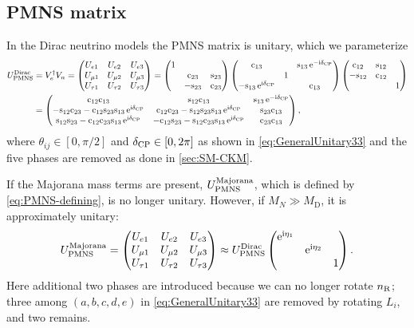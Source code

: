 \documentclass[CheatSheet]{subfiles}
\newcommand\MD[1][]{M_{\mathrm{D}#1}}
\newcommand\MN[1][]{M_{N#1}}
\begin{document}
\subsection{PMNS matrix}\label{sec:PMNS}
In the Dirac neutrino models the PMNS matrix is unitary, which we parameterize
\begin{equation}
\begin{split}
   U_{\mathrm{PMNS}}^{\text{Dirac}}&=V_e^\dagger V_n
 =\begin{pmatrix}
 U_{e1} & U_{e2} & U_{e3}\\
 U_{\mu1} & U_{\mu2} & U_{\mu3}\\
 U_{\tau1} & U_{\tau2} & U_{\tau3}
 \end{pmatrix}
 =
 \begin{pmatrix}1&&\\&\mathrm{c}_{23}&\mathrm{s}_{23}\\&-\mathrm{s}_{23}&\mathrm{c}_{23}\end{pmatrix}
 \begin{pmatrix}\mathrm{c}_{13}&&\mathrm{s}_{13}\mathop{}\!\mathrm{e}^{-\mathrm{i}\delta_{\mathrm{CP}}}\\&1&\\-\mathrm{s}_{13}\mathop{}\!\mathrm{e}^{\mathrm{i}\delta_{\mathrm{CP}}}&&\mathrm{c}_{13}\end{pmatrix}
 \begin{pmatrix}\mathrm{c}_{12}&\mathrm{s}_{12}&\\-\mathrm{s}_{12}&\mathrm{c}_{12}&\\&&1\end{pmatrix}
 \\&=
 \begin{pmatrix}
 \mathrm{c}_{12} \mathrm{c}_{13} & \mathrm{s}_{12} \mathrm{c}_{13} & \mathrm{s}_{13} \mathop{}\!\mathrm{e}^{-\mathrm{i}\delta_{\mathrm{CP}}}\\
 -\mathrm{s}_{12} \mathrm{c}_{23} - \mathrm{c}_{12} \mathrm{s}_{23} \mathrm{s}_{13} \mathop{}\!\mathrm{e}^{\mathrm{i}\delta_{\mathrm{CP}}}& \mathrm{c}_{12} \mathrm{c}_{23} - \mathrm{s}_{12}\mathrm{s}_{23}\mathrm{s}_{13} \mathop{}\!\mathrm{e}^{\mathrm{i}\delta_{\mathrm{CP}}}& \mathrm{s}_{23}\mathrm{c}_{13}\\
  \mathrm{s}_{12}\mathrm{s}_{23} - \mathrm{c}_{12} \mathrm{c}_{23} \mathrm{s}_{13}\mathop{}\!\mathrm{e}^{\mathrm{i}\delta_{\mathrm{CP}}} & -\mathrm{c}_{12}\mathrm{s}_{23}-\mathrm{s}_{12}\mathrm{c}_{23}\mathrm{s}_{13}\mathop{}\!\mathrm{e}^{\mathrm{i}\delta_{\mathrm{CP}}} & \mathrm{c}_{23} \mathrm{c}_{13}
\end{pmatrix},
\end{split}
\end{equation}
where $\theta_{ij}\in[0,\pi/2]$ and $\delta_{\mathrm{CP}}\in[0,2\pi]$ as shown in \cref{eq:GeneralUnitary33} and the five phases are removed as done in \cref{sec:SM-CKM}.

If the Majorana mass terms are present, $U_{\mathrm{PMNS}}^{\text{Majorana}}$, which is defined by \cref{eq:PMNS-defining}, is no longer unitary.
However, if $\MN\gg\MD$, it is approximately unitary:
\begin{equation}
   U_{\mathrm{PMNS}}^{\text{Majorana}}=
\begin{pmatrix}
 U_{e1} & U_{e2} & U_{e3}\\
 U_{\mu1} & U_{\mu2} & U_{\mu3}\\
 U_{\tau1} & U_{\tau2} & U_{\tau3}
 \end{pmatrix}
\approx
U_{\mathrm{PMNS}}^{\text{Dirac}}
\begin{pmatrix}\mathop{}\!\mathrm{e}^{\mathrm{i}\eta_1} \\ & \mathop{}\!\mathrm{e}^{\mathrm{i}\eta_2}\\&&1\end{pmatrix}.
\end{equation}
Here additional two phases are introduced because we can no longer rotate $n_{\mathrm{R}}$; three among $(a,b,c,d,e)$ in \cref{eq:GeneralUnitary33} are removed by rotating $L_i$, and two remains.
\end{document}
